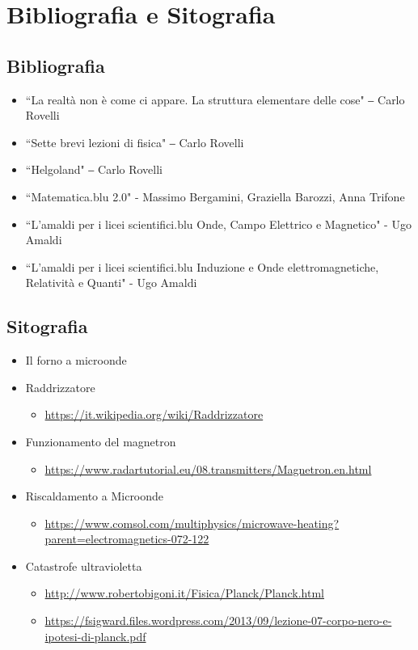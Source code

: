 \documentclass{article}
\begin{document}
\section{Bibliografia e Sitografia}
\subsection{Bibliografia}
\begin{itemize}[noitemsep]
    \item ``La realtà non è come ci appare. La struttura elementare delle cose" ‒ Carlo Rovelli 
    \item ``Sette brevi lezioni di fisica" ‒ Carlo Rovelli
    \item ``Helgoland" ‒ Carlo Rovelli
    \item ``Matematica.blu 2.0" - Massimo Bergamini, Graziella Barozzi, Anna Trifone
    \item ``L'amaldi per i licei scientifici.blu Onde, Campo Elettrico e Magnetico" - Ugo Amaldi
    \item ``L'amaldi per i licei scientifici.blu Induzione e Onde elettromagnetiche, Relatività e Quanti" - Ugo Amaldi
\end{itemize}
\subsection{Sitografia}
\begin{itemize}[noitemsep]
    \item Il forno a microonde 
    \begin{itemize}[noitemsep]{
    \item \url{https://iopscience.iop.org/article/10.1088/0031-9120/39/1/006}
     \item\url{https://it.wikipedia.org/wiki/Forno_a_microonde}
    \end{itemize}
    \item Raddrizzatore 
\begin{itemize}[noitemsep]
\item \url{https://it.wikipedia.org/wiki/Raddrizzatore}
\end{itemize}
    \item Funzionamento del magnetron  
\begin{itemize}[noitemsep]
\item \url{https://www.radartutorial.eu/08.transmitters/Magnetron.en.html}
\end{itemize}
    \item Riscaldamento a Microonde 
\begin{itemize}[noitemsep]
\item \url{https://www.comsol.com/multiphysics/microwave-heating?parent=electromagnetics-072-122}
\end{itemize}
    \item Catastrofe ultravioletta 
\begin{itemize}[noitemsep]
\item \url{http://www.robertobigoni.it/Fisica/Planck/Planck.html}
\item \url{https://fsigward.files.wordpress.com/2013/09/lezione-07-corpo-nero-e-ipotesi-di-planck.pdf}
\end{itemize}
\end{itemize}
\end{document}
